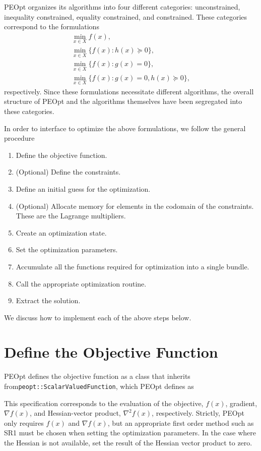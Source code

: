 \documentclass{report}
\begin{document}
       PEOpt organizes its algorithms into four different categories: unconstrained, inequality constrained, equality constrained, and constrained.  These categories correspond to the formulations
$$\begin{array}{l}
    \min\limits_{x\in X} f(x),\\
    \min\limits_{x\in X} \{ f(x) : h(x)\succeq 0\},\\
    \min\limits_{x\in X} \{ f(x) : g(x)=0 \},\\
    \min\limits_{x\in X} \{ f(x) : g(x)=0, h(x)\succeq 0 \},
\end{array}$$
respectively.  Since these formulations necessitate different algorithms, the overall structure of PEOpt and the algorithms themselves have been segregated into these categories.

        In order to interface to optimize the above formulations, we follow the general procedure
\begin{enumerate}
    \item Define the objective function.
    \item (Optional) Define the constraints.
    \item Define an initial guess for the optimization.
    \item (Optional) Allocate memory for elements in the codomain of the constraints.  These are the Lagrange multipliers. 
    \item Create an optimization state.
    \item Set the optimization parameters.
    \item Accumulate all the functions required for optimization into a single bundle.
    \item Call the appropriate optimization routine.
    \item Extract the solution.
\end{enumerate}
We discuss how to implement each of the above steps below. 

\section{Define the Objective Function}

        PEOpt defines the objective function as a class that inherits from\linebreak\texttt{peopt::ScalarValuedFunction}, which PEOpt defines as

This specification corresponds to the evaluation of the objective, $f(x)$, gradient, $\nabla f(x)$, and Hessian-vector product, $\nabla^2 f(x)$, respectively.  Strictly, PEOpt only requires $f(x)$ and $\nabla f(x)$, but an appropriate first order method such as SR1 must be chosen when setting the optimization parameters.  In the case where the Hessian is not available, set the result of the Hessian vector product to zero. 
\end{document}
